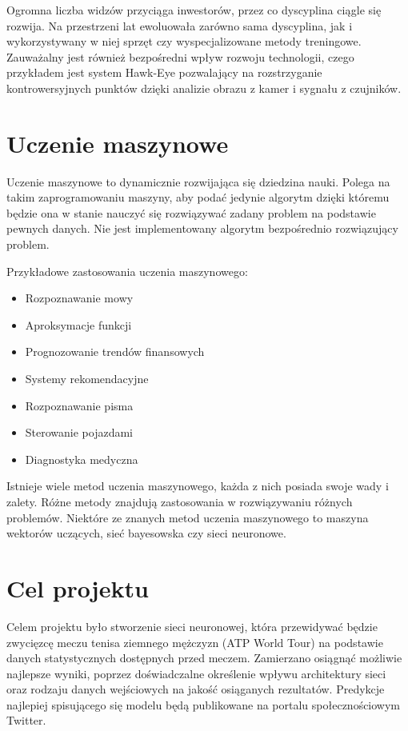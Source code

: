 Ogromna liczba widzów przyciąga inwestorów, przez co dyscyplina ciągle się rozwija. Na przestrzeni lat ewoluowała zarówno sama dyscyplina, jak i wykorzystywany w niej sprzęt czy wyspecjalizowane metody treningowe. Zauważalny jest również bezpośredni wpływ rozwoju technologii, czego przykładem jest system Hawk-Eye pozwalający na rozstrzyganie kontrowersyjnych punktów dzięki analizie obrazu z kamer i sygnału z czujników.



\section{Uczenie maszynowe}
Uczenie maszynowe to dynamicznie rozwijająca się dziedzina nauki. Polega na takim zaprogramowaniu maszyny, aby podać jedynie algorytm dzięki któremu będzie ona w stanie nauczyć się rozwiązywać zadany problem na podstawie pewnych danych. Nie jest implementowany algorytm bezpośrednio rozwiązujący problem. 

Przykładowe zastosowania uczenia maszynowego:
\begin{itemize}
\item Rozpoznawanie mowy
\item Aproksymacje funkcji
\item Prognozowanie trendów finansowych
\item Systemy rekomendacyjne
\item Rozpoznawanie pisma
\item Sterowanie pojazdami
\item Diagnostyka medyczna
\end{itemize}

Istnieje wiele metod uczenia maszynowego, każda z nich posiada swoje wady i zalety. Różne metody znajdują zastosowania w rozwiązywaniu różnych problemów. Niektóre ze znanych metod uczenia maszynowego to maszyna wektorów uczących, sieć bayesowska czy sieci neuronowe. 

\section{Cel projektu}
Celem projektu było stworzenie sieci neuronowej, która przewidywać będzie zwycięzcę meczu tenisa ziemnego mężczyzn (ATP World Tour) na podstawie danych statystycznych dostępnych przed meczem. Zamierzano osiągnąć możliwie najlepsze wyniki, poprzez doświadczalne określenie wpływu architektury sieci oraz rodzaju danych wejściowych na jakość osiąganych rezultatów. Predykcje najlepiej spisującego się modelu będą publikowane na portalu społecznościowym Twitter.

